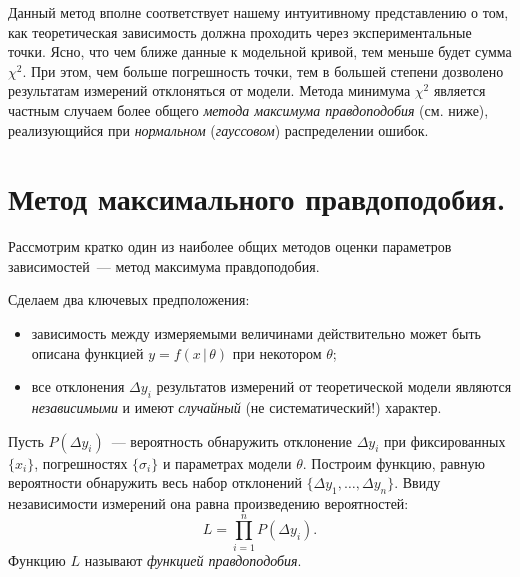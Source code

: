 Данный метод вполне соответствует нашему интуитивному представлению
о том, как теоретическая зависимость должна проходить через экспериментальные
точки. Ясно, что чем ближе данные к модельной кривой, тем
меньше будет сумма $\chi^2$. При этом, чем больше погрешность точки, тем
в большей степени дозволено результатам измерений отклоняться от модели.
Метода минимума $\chi^2$ является частным случаем
более общего \emph{метода максимума правдоподобия} (см. ниже),
реализующийся при \emph{нормальном} (\emph{гауссовом}) распределении ошибок.





\section{Метод максимального правдоподобия.} 
Рассмотрим кратко один
из наиболее общих методов оценки параметров зависимостей~---
метод максимума правдоподобия.

Сделаем два ключевых предположения:
\begin{itemize}
 \item  зависимость между измеряемыми величинами действительно может
 быть описана функцией $y=f(x\,|\,\theta)$ при некотором $\theta$;
 \item все отклонения $\Delta y_i$ результатов измерений от теоретической модели
 являются \emph{независимыми} и имеют \emph{случайный} (не систематический!) характер.
\end{itemize}

Пусть $P(\Delta y_i)$~--- вероятность обнаружить отклонение $\Delta y_i$
при фиксированных $\{x_i\}$, погрешностях $\{\sigma_i\}$ и параметрах модели $\theta$.
Построим функцию, равную вероятности обнаружить
весь набор отклонений $\{\Delta y_1,\ldots,\Delta y_n\}$. Ввиду независимости
измерений она равна произведению вероятностей:
\begin{equation}\label{eq:L}
L =  \prod_{i=1}^n P(\Delta y_i).
\end{equation}
Функцию $L$ называют \emph{функцией правдоподобия}.

